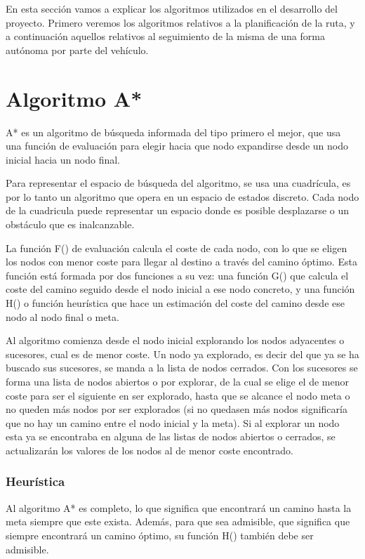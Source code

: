 
En esta sección vamos a explicar los algoritmos utilizados en el desarrollo del proyecto. Primero veremos los algoritmos relativos a la planificación de la ruta, y a continuación aquellos relativos al seguimiento de la misma de una forma autónoma por parte del vehículo.

\section{Algoritmo A*}

A* es un algoritmo de búsqueda informada del tipo primero el mejor, que usa una función de evaluación para elegir hacia que nodo expandirse desde un nodo inicial hacia un nodo final.

Para representar el espacio de búsqueda del algoritmo, se usa una cuadrícula, es por lo tanto un algoritmo que opera en un espacio de estados discreto. Cada nodo de la cuadricula puede representar un espacio donde es posible desplazarse o un obstáculo que es inalcanzable.

La función F() de evaluación calcula el coste de cada nodo, con lo que se eligen los nodos con menor coste para llegar al destino a través del camino óptimo. Esta función está formada por dos funciones a su vez: una función G() que calcula el coste del camino seguido desde el nodo inicial a ese nodo concreto, y una función H() o función heurística que hace un estimación del coste del camino desde ese nodo al nodo final o meta.

Al algoritmo comienza desde el nodo inicial explorando los nodos adyacentes o sucesores, cual es de menor coste. Un nodo ya explorado, es decir del que ya se ha buscado sus sucesores, se manda a la lista de nodos cerrados. Con los sucesores se forma una lista de nodos abiertos o por explorar, de la cual se elige el de menor coste para ser el siguiente en ser explorado, hasta que se alcance el nodo meta o no queden más nodos por ser explorados (si no quedasen más nodos significaría que no hay un camino entre el nodo inicial y la meta). Si al explorar un nodo esta ya se encontraba en alguna de las listas de nodos abiertos o cerrados, se actualizarán los valores de los nodos al de menor coste encontrado.

\subsubsection{Heurística} \label{heuristicaaestrella}
Al algoritmo A* es completo, lo que significa que encontrará un camino hasta la meta siempre que este exista. Además, para que sea admisible, que significa que siempre encontrará un camino óptimo, su función H() también debe ser admisible.

